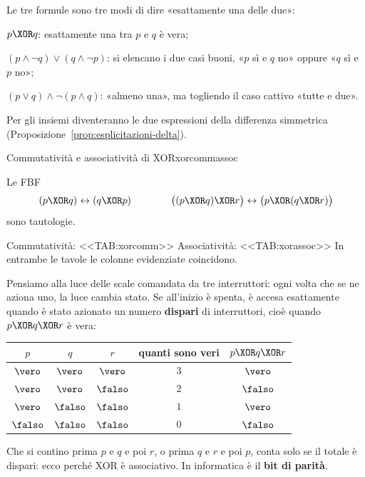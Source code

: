 \begin{spiegazione}
    Le tre formule sono tre modi di dire «esattamente una delle due»:
    \begin{passi}
        \item $p \XOR q$: esattamente una tra $p$ e $q$ è vera;
        \item $(p \wedge \neg q) \vee (q \wedge \neg p)$: si elencano i due casi buoni, «$p$ sì e $q$ no» oppure «$q$ sì e $p$ no»;
        \item $(p \vee q) \wedge \neg(p \wedge q)$: «almeno una», ma togliendo il caso cattivo «tutte e due».
    \end{passi}
    Per gli insiemi diventeranno le due espressioni della differenza simmetrica (Proposizione~\ref{prop:esplicitazioni-delta}).
\end{spiegazione}


\begin{concetto}
\begin{Proposizione}{Commutatività e associatività di XOR}{xorcommassoc}
    \begin{prerequisiti}
    \end{prerequisiti}
    Le FBF
    \[ (p \XOR q) \leftrightarrow (q \XOR p) \qquad\qquad \big((p \XOR q) \XOR r\big) \leftrightarrow \big(p \XOR (q \XOR r)\big) \]
    sono tautologie.
\end{Proposizione}

\begin{dimostrazione}
    Commutatività:
    <<TAB:xorcomm>>
    Associatività:
    <<TAB:xorassoc>>
    In entrambe le tavole le colonne evidenziate coincidono.
\end{dimostrazione}
\end{concetto}

\begin{spiegazione}
    Pensiamo alla luce delle scale comandata da tre interruttori: ogni volta che se ne aziona uno, la luce cambia stato. Se all'inizio è spenta, è accesa
    esattamente quando è stato azionato un numero \textbf{dispari} di interruttori, cioè quando $p \XOR q \XOR r$ è vera:
    \begin{center}
    \renewcommand{\arraystretch}{1.15}
    \begin{tabular}{ccc|c|c}
        $p$ & $q$ & $r$ & quanti sono veri & $p \XOR q \XOR r$ \\ \hline
        $\vero$ & $\vero$ & $\vero$ & $3$ & $\vero$ \\
        $\vero$ & $\vero$ & $\falso$ & $2$ & $\falso$ \\
        $\vero$ & $\falso$ & $\falso$ & $1$ & $\vero$ \\
        $\falso$ & $\falso$ & $\falso$ & $0$ & $\falso$ \\
    \end{tabular}
    \end{center}
    Che si contino prima $p$ e $q$ e poi $r$, o prima $q$ e $r$ e poi $p$, conta solo se il totale è dispari: ecco perché XOR è associativo. In informatica
    è il \textbf{bit di parità}.
\end{spiegazione}


